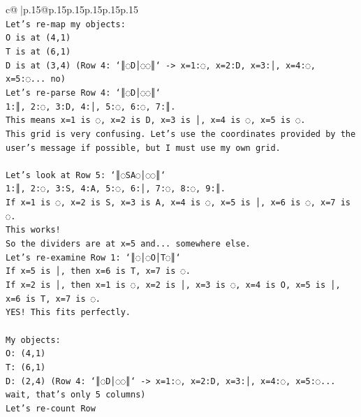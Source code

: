 \documentclass{article}
\begin{document}
{\begin{supertabular}{c@{$\;$}|p{.15\linewidth}@{}p{.15\linewidth}p{.15\linewidth}p{.15\linewidth}p{.15\linewidth}p{.15\linewidth}}
{{{\\ 
\texttt{Let's re{-}map my objects:} \\
\texttt{O is at (4,1)} \\
\texttt{T is at (6,1)} \\
\texttt{D is at (3,4) (Row 4: `║◌D│◌◌║` {-}> x=1:◌, x=2:D, x=3:│, x=4:◌, x=5:◌... no)} \\
\texttt{Let's re{-}parse Row 4: `║◌D│◌◌║`} \\
\texttt{1:║, 2:◌, 3:D, 4:│, 5:◌, 6:◌, 7:║.} \\
\texttt{This means x=1 is ◌, x=2 is D, x=3 is │, x=4 is ◌, x=5 is ◌.} \\
\texttt{This grid is very confusing. Let's use the coordinates provided by the user's message if possible, but I must use my own grid.} \\
\\ 
\texttt{Let's look at Row 5: `║◌SA◌│◌◌║`} \\
\texttt{1:║, 2:◌, 3:S, 4:A, 5:◌, 6:│, 7:◌, 8:◌, 9:║.} \\
\texttt{If x=1 is ◌, x=2 is S, x=3 is A, x=4 is ◌, x=5 is │, x=6 is ◌, x=7 is ◌.} \\
\texttt{This works!} \\
\texttt{So the dividers are at x=5 and... somewhere else.} \\
\texttt{Let's re{-}examine Row 1: `║◌│◌O│T◌║`} \\
\texttt{If x=5 is │, then x=6 is T, x=7 is ◌.} \\
\texttt{If x=2 is │, then x=1 is ◌, x=2 is │, x=3 is ◌, x=4 is O, x=5 is │, x=6 is T, x=7 is ◌.} \\
\texttt{YES! This fits perfectly.} \\
\\ 
\texttt{My objects:} \\
\texttt{O: (4,1)} \\
\texttt{T: (6,1)} \\
\texttt{D: (2,4) (Row 4: `║◌D│◌◌║` {-}> x=1:◌, x=2:D, x=3:│, x=4:◌, x=5:◌... wait, that's only 5 columns)} \\
\texttt{Let's re{-}count Row} \\
            }
        }
    }
     \\ \\


\end{supertabular}}
\end{document}
